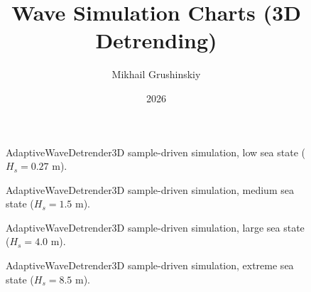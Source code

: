 \documentclass[11pt,letterpaper]{article}
\title{Wave Simulation Charts (3D Detrending)}
\author{Mikhail Grushinskiy}
\date{2026}
\begin{document}
    \maketitle


\begin{figure}[H]\centering
\resizebox{\textwidth}{!}{}
\caption{AdaptiveWaveDetrender3D sample-driven simulation, low sea state ($H_s=0.27$ m).}
\label{fig:adaptive_wave_detrender3d_sim_h0270}
\end{figure}

\begin{figure}[H]\centering
\resizebox{\textwidth}{!}{}
\caption{AdaptiveWaveDetrender3D sample-driven simulation, medium sea state ($H_s=1.5$ m).}
\label{fig:adaptive_wave_detrender3d_sim_h1500}
\end{figure}

\begin{figure}[H]\centering
\resizebox{\textwidth}{!}{}
\caption{AdaptiveWaveDetrender3D sample-driven simulation, large sea state ($H_s=4.0$ m).}
\label{fig:adaptive_wave_detrender3d_sim_h4000}
\end{figure}

\begin{figure}[H]\centering
\resizebox{\textwidth}{!}{}
\caption{AdaptiveWaveDetrender3D sample-driven simulation, extreme sea state ($H_s=8.5$ m).}
\label{fig:adaptive_wave_detrender3d_sim_h8500}
\end{figure}
\end{document}
